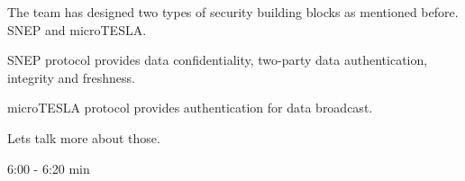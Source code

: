 \tiny
The team has designed two types of security building blocks as mentioned before. SNEP and microTESLA.

SNEP protocol provides data confidentiality, two-party data authentication, integrity and freshness.

microTESLA protocol provides authentication for data broadcast.

Lets talk more about those.

\Large{6:00 - 6:20 min}